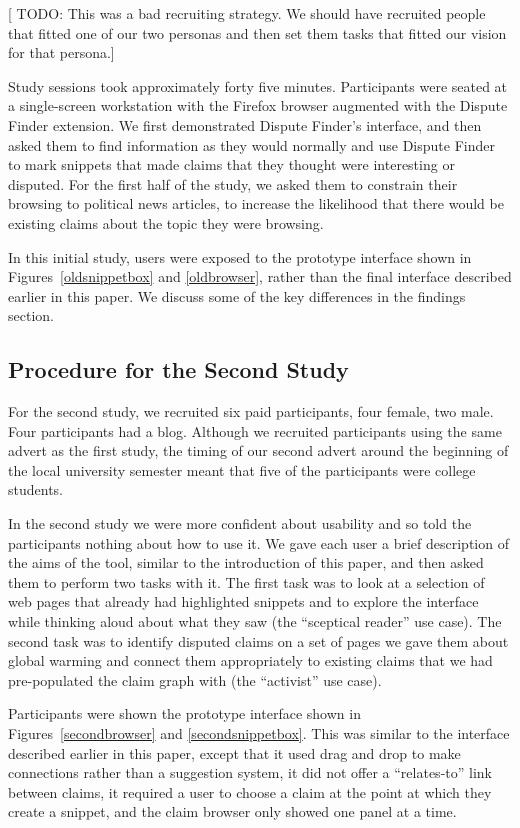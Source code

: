 \documentclass{www2010-submission}
\newcommand{\todo}[1]{{[\color{blue} TODO: #1]}}
\begin{document}
\todo{This was a bad recruiting strategy. We should have recruited people that fitted one of our two personas and then set them tasks that fitted our vision for that persona.}

Study sessions took approximately forty five minutes. Participants were seated at a single-screen workstation with the Firefox browser augmented with the Dispute Finder extension. We first demonstrated Dispute Finder's interface, and then asked them to find information as they would normally and use Dispute Finder to mark snippets that made claims that they thought were interesting or disputed. For the first half of the study, we asked them to constrain their browsing to political news articles, to increase the likelihood that there would be existing claims about the topic they were browsing.

In this initial study, users were exposed to the prototype interface shown in Figures~\ref{oldsnippetbox} and \ref{oldbrowser}, rather than the final interface described earlier in this paper. We discuss some of the key differences in the findings section.

\subsection{Procedure for the Second Study}

For the second study, we recruited six paid participants, four female, two male. Four participants had a blog. Although we recruited participants using the same advert as the first study, the timing of our second advert around the beginning of the local university semester meant that five of the participants were college students. 

In the second study we were more confident about usability and so told the participants nothing about how to use it. We gave each user a brief description of the aims of the tool, similar to the introduction of this paper, and then asked them to perform two tasks with it. The first task was to look at a selection of web pages that already had highlighted snippets and to explore the interface while thinking aloud about what they saw (the ``sceptical reader'' use case). The second task was to identify disputed claims on a set of pages we gave them about global warming and connect them appropriately to existing claims that we had pre-populated the claim graph with (the ``activist'' use case). 

Participants were shown the prototype interface shown in Figures~\ref{secondbrowser} and \ref{secondsnippetbox}. This was similar to the interface described earlier in this paper, except that it used drag and drop to make connections rather than a suggestion system, it did not offer a ``relates-to'' link between claims, it required a user to choose a claim at the point at which they create a snippet, and the claim browser only showed one panel at a time. 
\end{document}
